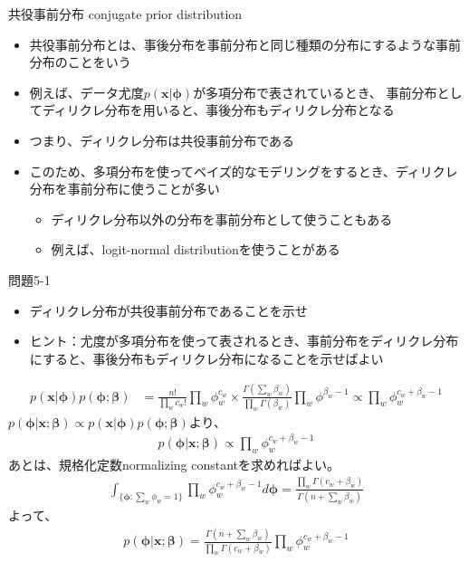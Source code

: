 \documentclass[aspectratio=169,unicode,dvipdfmx,14pt]{beamer}
\begin{document}
\begin{frame}{共役事前分布 conjugate prior distribution}
\begin{itemize}
\item 共役事前分布とは、事後分布を事前分布と同じ種類の分布にするような事前分布のことをいう
\item 例えば、データ尤度$p(\bm{x}|\bm{\phi})$が多項分布で表されているとき、
事前分布としてディリクレ分布を用いると、事後分布もディリクレ分布となる
\item つまり、ディリクレ分布は共役事前分布である
\item このため、多項分布を使ってベイズ的なモデリングをするとき、ディリクレ分布を事前分布に使うことが多い
\begin{itemize}
\item ディリクレ分布以外の分布を事前分布として使うこともある
\item 例えば、logit-normal distributionを使うことがある
\end{itemize}
\end{itemize}
\end{frame}

\begin{frame}{問題5-1}
\large
\begin{itemize}
\item ディリクレ分布が共役事前分布であることを示せ
\item ヒント：尤度が多項分布を使って表されるとき、事前分布をディリクレ分布にすると、事後分布もディリクレ分布になることを示せばよい
\end{itemize}
\end{frame}

\begin{frame}
\FontMath
\begin{align}
p(\bm{x}|\bm{\phi})p(\bm{\phi};\bm{\beta})
& =
\frac{n!}{\prod_w c_w!} \prod_w \phi_w^{c_w} \times \frac{\Gamma(\sum_w \beta_w)}{\prod_w \Gamma(\beta_w)}\prod_w \phi^{\beta_w - 1}
\propto
\prod_w \phi_w^{c_w + \beta_w - 1}
\end{align}
$p(\bm{\phi}|\bm{x};\bm{\beta}) \propto p(\bm{x}|\bm{\phi})p(\bm{\phi};\bm{\beta})$より、
\begin{align}
p(\bm{\phi} | \bm{x}; \bm{\beta}) \propto \prod_w \phi_w^{c_w + \beta_w - 1}
\end{align}
あとは、規格化定数normalizing constantを求めればよい。
\begin{align}
\int_{\{ \bm{\phi}: \sum_w \phi_w = 1 \}} \prod_w \phi_w^{c_w + \beta_w - 1} d\bm{\phi} 
= \frac{\prod_w \Gamma(c_w+\beta_w)}{\Gamma(n + \sum_w \beta_w)}
\end{align}
よって、
\begin{align}
p(\bm{\phi} | \bm{x}; \bm{\beta}) = \frac{\Gamma(n + \sum_w \beta_w)}{\prod_w \Gamma(c_w+\beta_w)}
\prod_w \phi_w^{c_w + \beta_w - 1}
\end{align}
\end{frame}
\end{document}
